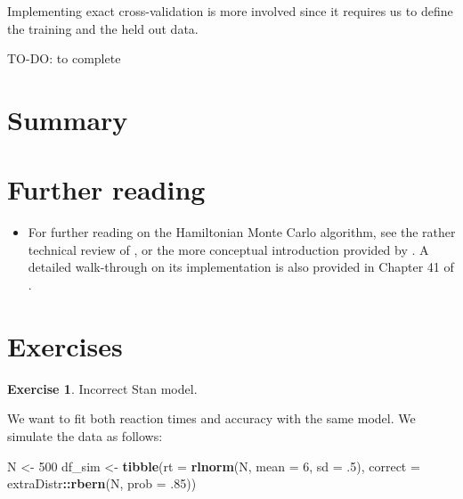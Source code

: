 \documentclass[12pt,]{krantz}
\newenvironment{Shaded}{\begin{snugshade}}{\end{snugshade}}
\newcommand{\DataTypeTok}[1]{\textcolor[rgb]{0.13,0.29,0.53}{#1}}
\newcommand{\DecValTok}[1]{\textcolor[rgb]{0.00,0.00,0.81}{#1}}
\newcommand{\FloatTok}[1]{\textcolor[rgb]{0.00,0.00,0.81}{#1}}
\newcommand{\KeywordTok}[1]{\textcolor[rgb]{0.13,0.29,0.53}{\textbf{#1}}}
\newcommand{\NormalTok}[1]{#1}
\newcommand{\OperatorTok}[1]{\textcolor[rgb]{0.81,0.36,0.00}{\textbf{#1}}}
\newcommand{\StringTok}[1]{\textcolor[rgb]{0.31,0.60,0.02}{#1}}
\providecommand{\tightlist}{%
  \setlength{\itemsep}{0pt}\setlength{\parskip}{0pt}}
\theoremstyle{definition}
\theoremstyle{definition}
\theoremstyle{definition}
\newtheorem{exercise}{Exercise}[chapter]
\theoremstyle{remark}
\begin{document}
Implementing exact cross-validation is more involved since it requires us to define the training and the held out data.

TO-DO: to complete

\hypertarget{summary-6}{%
\section{Summary}\label{summary-6}}

\hypertarget{further-reading-8}{%
\section{Further reading}\label{further-reading-8}}

\begin{itemize}
\tightlist
\item
  For further reading on the Hamiltonian Monte Carlo algorithm, see the rather technical review of \citet{betancourt2017conceptual}, or the more conceptual introduction provided by \citet{monnahanFasterEstimationBayesian2017}. A detailed walk-through on its implementation is also provided in Chapter 41 of \citet{mackay2003information}.
\end{itemize}

\hypertarget{exercises-7}{%
\section{Exercises}\label{exercises-7}}

\begin{exercise}
\protect\hypertarget{exr:badstan}{}{\label{exr:badstan} }Incorrect Stan model.
\end{exercise}

We want to fit both reaction times and accuracy with the same model. We simulate the data as follows:

\begin{Shaded}
\begin{Highlighting}[]
\NormalTok{N <-}\StringTok{ }\DecValTok{500}
\NormalTok{df_sim <-}\StringTok{ }\KeywordTok{tibble}\NormalTok{(}\DataTypeTok{rt =} \KeywordTok{rlnorm}\NormalTok{(N, }\DataTypeTok{mean =} \DecValTok{6}\NormalTok{, }\DataTypeTok{sd =} \FloatTok{.5}\NormalTok{),}
                 \DataTypeTok{correct =}\NormalTok{ extraDistr}\OperatorTok{::}\KeywordTok{rbern}\NormalTok{(N, }\DataTypeTok{prob =} \FloatTok{.85}\NormalTok{))}
\end{Highlighting}
\end{Shaded}
\end{document}
